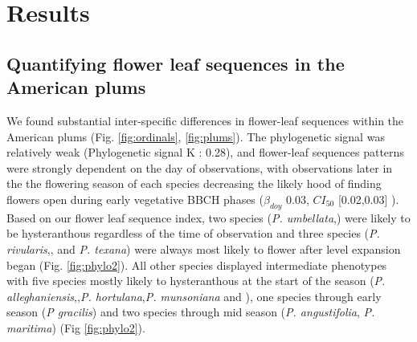 \documentclass{article}[11pt]
\begin{document}




\section*{Results}
\subsection*{Quantifying flower leaf sequences in the American plums}
We found substantial inter-specific differences in flower-leaf sequences within the American plums (Fig. \ref{fig:ordinals}, \ref{fig:plums}). The phylogenetic signal was relatively weak (Phylogenetic signal K : 0.28), and flower-leaf sequences patterns were strongly dependent on the day of observations, with observations later in the the flowering season of each species decreasing the likely hood of finding flowers open during early vegetative BBCH phases ($\beta_{doy}$ 0.03, $CI_{50}$ [0.02,0.03] ). Based on our flower leaf sequence index, two species (\textit{P. umbellata},) were likely to be hysteranthous regardless of the time of observation and three species (\textit{P. rivularis},, and \textit{P. texana}) were always most likely to flower after level expansion began (Fig. \ref{fig:phylo2}). All other species displayed intermediate phenotypes with five species mostly likely to hysteranthous at the start of the season (\textit{P. alleghaniensis},,\textit{P. hortulana},\textit{P. munsoniana} and ), one species through early season (\textit{P gracilis}) and two species through mid season (\textit{P. angustifolia}, \textit{P. maritima}) (Fig \ref{fig:phylo2}).
\end{document}
